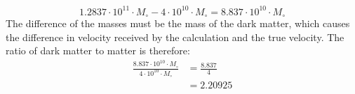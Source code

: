 \begin{equation*}
  1.2837 \cdot 10^{11} \cdot M_{\circ} - 4 \cdot 10^{10} \cdot M_{\circ} = 8.837 \cdot 10^{10} \cdot M_{\circ}
\end{equation*}
The difference of the masses must be the mass of the dark matter, which causes the difference in velocity
received by the calculation and the true velocity. The ratio of dark matter to matter is therefore:
\begin{equation*}
  \begin{split}
    \frac{8.837 \cdot 10^{10} \cdot M_{\circ}}{4 \cdot 10^{10} \cdot M_{\circ}} &= \frac{8.837}{4}\\
                                                                                &= 2.20925
  \end{split}
\end{equation*}\\
\\
\noindent{}\\
